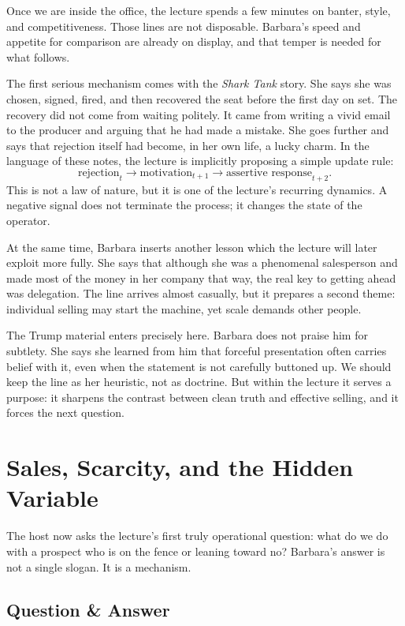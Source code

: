 Once we are inside the office, the lecture spends a few minutes on banter, style, and competitiveness. Those lines are not disposable. Barbara's speed and appetite for comparison are already on display, and that temper is needed for what follows.

The first serious mechanism comes with the \emph{Shark Tank} story. She says she was chosen, signed, fired, and then recovered the seat before the first day on set. The recovery did not come from waiting politely. It came from writing a vivid email to the producer and arguing that he had made a mistake. She goes further and says that rejection itself had become, in her own life, a lucky charm. In the language of these notes, the lecture is implicitly proposing a simple update rule:
\begin{equation}
\text{rejection}_t \longrightarrow \text{motivation}_{t+1} \longrightarrow \text{assertive response}_{t+2}.
\end{equation}
This is not a law of nature, but it is one of the lecture's recurring dynamics. A negative signal does not terminate the process; it changes the state of the operator.

At the same time, Barbara inserts another lesson which the lecture will later exploit more fully. She says that although she was a phenomenal salesperson and made most of the money in her company that way, the real key to getting ahead was delegation. The line arrives almost casually, but it prepares a second theme: individual selling may start the machine, yet scale demands other people.

The Trump material enters precisely here. Barbara does not praise him for subtlety. She says she learned from him that forceful presentation often carries belief with it, even when the statement is not carefully buttoned up. We should keep the line as her heuristic, not as doctrine. But within the lecture it serves a purpose: it sharpens the contrast between clean truth and effective selling, and it forces the next question.

\section{Sales, Scarcity, and the Hidden Variable}

The host now asks the lecture's first truly operational question: what do we do with a prospect who is on the fence or leaning toward no? Barbara's answer is not a single slogan. It is a mechanism.

\subsection{Question \& Answer}

